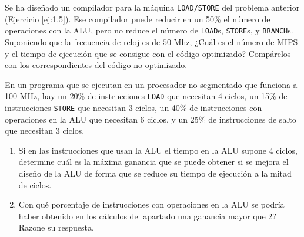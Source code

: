 \begin{ejercicio}
    Se ha diseñado un compilador para la máquina \verb|LOAD/STORE| del problema anterior (Ejercicio \ref{ej:1.5}). Ese
    compilador puede reducir en un 50\% el número de operaciones con la ALU, pero no reduce el número de
    \verb|LOAD|s, \verb|STORE|s, y \verb|BRANCH|s. Suponiendo que la frecuencia de reloj es de $50$ Mhz,
    ¿Cuál es el número de
    MIPS y el tiempo de ejecución que se consigue con el código optimizado? Compárelos con los
    correspondientes del código no optimizado.
\end{ejercicio}

\begin{ejercicio}
    En un programa que se ejecutan en un procesador no segmentado que funciona a 100 MHz, hay
    un 20\% de instrucciones \verb|LOAD| que necesitan 4 ciclos, un 15\% de instrucciones \verb|STORE| que necesitan 3 ciclos,
    un 40\% de instrucciones con operaciones en la ALU que necesitan 6 ciclos, y un 25\% de instrucciones de
    salto que necesitan 3 ciclos.
    \begin{enumerate}
        \item\label{ej:1.7a}
        Si en las instrucciones que usan la ALU el tiempo en la ALU supone 4 ciclos, determine cuál es la máxima ganancia que se puede obtener si se mejora el diseño de la ALU de forma que
        se reduce su tiempo de ejecución a la mitad de ciclos.
        \item Con qué porcentaje de instrucciones con operaciones en la ALU se podría haber obtenido en los cálculos del apartado \label{ej:1.7a} una ganancia mayor que 2?
        Razone su respuesta.
    \end{enumerate}
\end{ejercicio}


